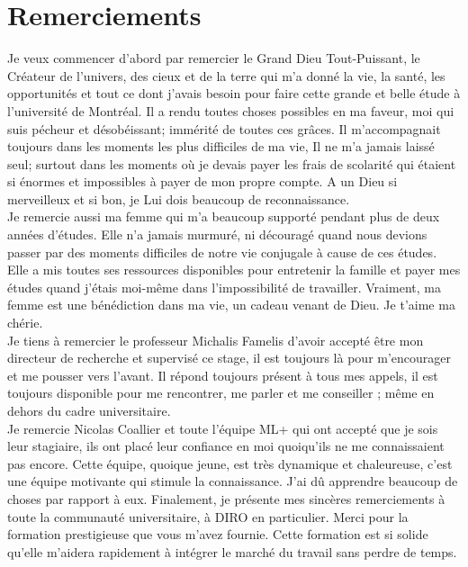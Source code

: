\documentclass[12pt, french]{report}
\begin{document}
\tableofcontents
\newpage	
{}
\chapter*{Remerciements}
Je veux commencer d'abord par remercier le Grand Dieu Tout-Puissant, le Créateur de l'univers, des cieux et de la terre qui m'a donné la vie, la santé, les opportunités et tout ce dont j'avais besoin pour faire cette grande et belle étude à l'université de Montréal. Il a rendu toutes choses possibles en ma faveur, moi qui suis pécheur et désobéissant; immérité de toutes ces grâces. Il m'accompagnait toujours dans les moments les plus difficiles de ma vie, Il ne m'a jamais laissé seul; surtout dans les moments où je devais payer les frais de scolarité qui étaient si énormes et impossibles à payer de mon propre compte. A un Dieu si merveilleux et si bon, je Lui dois beaucoup de reconnaissance.  \\
	
	Je remercie aussi ma femme qui m'a beaucoup supporté pendant plus de deux années d'études. Elle n'a jamais murmuré, ni découragé quand nous devions passer par des moments difficiles de notre vie conjugale à cause de ces études. Elle a mis toutes ses ressources disponibles pour entretenir la famille et payer mes études quand j’étais moi-même dans l’impossibilité de travailler. Vraiment, ma femme est une bénédiction dans ma vie, un cadeau venant de Dieu. Je t’aime ma chérie. \\
	
	Je tiens à remercier le professeur Michalis Famelis d’avoir accepté être mon directeur de recherche et supervisé ce stage, il est toujours là pour m’encourager et me pousser vers l’avant. Il répond toujours présent à tous mes appels, il est toujours disponible pour me rencontrer, me parler et me conseiller ; même en dehors du cadre universitaire.  \\
	
	Je remercie Nicolas Coallier et toute l’équipe ML+ qui ont accepté que je sois leur stagiaire, ils ont placé  leur confiance en moi quoiqu’ils ne me connaissaient pas encore. Cette équipe, quoique jeune, est très dynamique et chaleureuse, c’est une équipe motivante qui stimule la connaissance. J’ai dû apprendre beaucoup de choses par rapport à eux.
	Finalement, je présente mes sincères remerciements à toute la communauté universitaire, à DIRO en particulier. Merci pour la formation prestigieuse que vous m’avez fournie. Cette formation est si solide qu’elle m’aidera rapidement à intégrer le marché du travail sans perdre de temps. 
	
\end{document}
